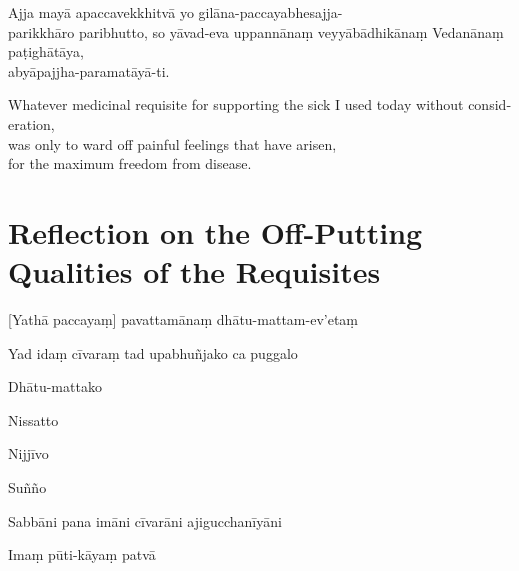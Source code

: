 Ajja mayā apaccavekkhitvā yo gilāna-paccayabhesajja-\\ parikkhāro paribhutto, so
yāvad-eva uppannānaṃ veyyābādhikānaṃ Vedanānaṃ paṭighātāya,\\
abyāpajjha-paramatāyā-ti. 

\begin{english}
  Whatever medicinal requisite for supporting the sick I used today without consideration,\\
  was only to ward off painful feelings that have arisen,\\
  for the maximum freedom from disease.
\end{english}

\section[Reflection on the Off-Putting Qualities]{Reflection on the Off-Putting Qualities of the Requisites}



\begin{leader}
\end{leader}

[Yathā paccayaṃ] pavattamānaṃ dhātu-mattam-ev'etaṃ


Yad idaṃ cīvaraṃ tad upabhuñjako ca puggalo


Dhātu-mattako


Nissatto


Nijjīvo


Suñño


Sabbāni pana imāni cīvarāni ajigucchanīyāni


Imaṃ pūti-kāyaṃ patvā


